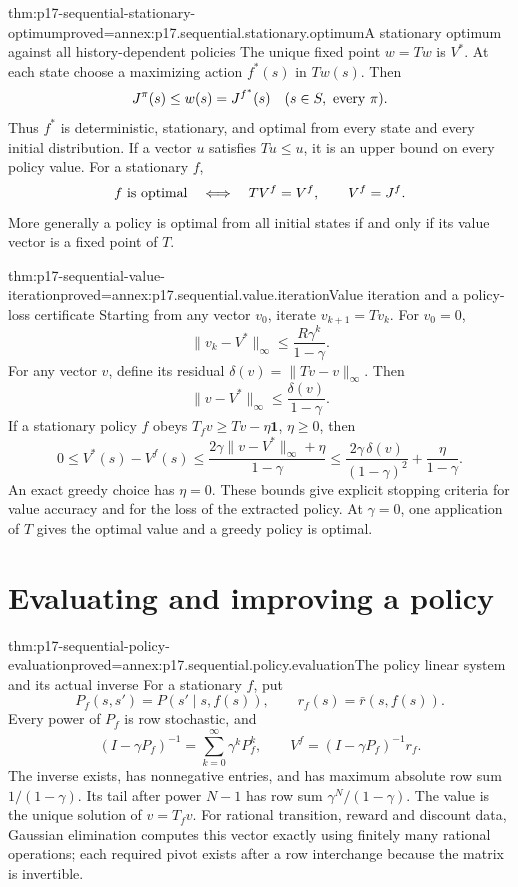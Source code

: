 \begin{hbtheorem}{thm:p17-sequential-stationary-optimum}{proved=annex:p17.sequential.stationary.optimum}{A stationary optimum against all history-dependent policies}
The unique fixed point \(w=Tw\) is \(V^*\).
At each state choose a maximizing action \(f^*(s)\) in
\(Tw(s)\). Then
\[
               J^\pi(s)\leq w(s)=J^{f^*}(s)
                       \quad(s\in S,\ \hbox{every }\pi).
\]
Thus \(f^*\) is deterministic, stationary, and optimal from
every state and every initial distribution.
If a vector \(u\) satisfies \(Tu\leq u\), it is an upper
bound on every policy value. For a stationary \(f\),
\[
              f\hbox{ is optimal}
          \quad\Longleftrightarrow\quad TV^f=V^f,
                 \qquad V^f=J^f.
\]
More generally a policy is optimal from all initial states
if and only if its value vector is a fixed point of \(T\).
\end{hbtheorem}

\begin{hbtheorem}{thm:p17-sequential-value-iteration}{proved=annex:p17.sequential.value.iteration}{Value iteration and a policy-loss certificate}
Starting from any vector \(v_0\), iterate \(v_{k+1}=Tv_k\).
For \(v_0=0\),
\[
                   \|v_k-V^*\|_\infty
                        \leq\frac{R\gamma^k}{1-\gamma}.
\]
For any vector \(v\), define its residual
\(\delta(v)=\|Tv-v\|_\infty\). Then
\[
                       \|v-V^*\|_\infty
                             \leq\frac{\delta(v)}{1-\gamma}.
\]
If a stationary policy \(f\) obeys
\(T_fv\geq Tv-\eta\mathbf1\), \(\eta\geq0\), then
\[
 0\leq V^*(s)-V^f(s)
       \leq\frac{2\gamma\|v-V^*\|_\infty+\eta}{1-\gamma}
       \leq
          \frac{2\gamma\,\delta(v)}{(1-\gamma)^2}
                         +\frac{\eta}{1-\gamma}.
\]
An exact greedy choice has \(\eta=0\). These bounds give
explicit stopping criteria for value accuracy and for the
loss of the extracted policy. At \(\gamma=0\), one
application of \(T\) gives the optimal value and a greedy
policy is optimal.
\end{hbtheorem}

\section{Evaluating and improving a policy}

\begin{hbtheorem}{thm:p17-sequential-policy-evaluation}{proved=annex:p17.sequential.policy.evaluation}{The policy linear system and its actual inverse}
For a stationary \(f\), put
\[
 P_f(s,s')=P(s'\mid s,f(s)),\qquad r_f(s)=\bar r(s,f(s)).
\]
Every power of \(P_f\) is row stochastic, and
\[
 (I-\gamma P_f)^{-1}=\sum_{k=0}^{\infty}\gamma^kP_f^k,
 \qquad
 V^f=(I-\gamma P_f)^{-1}r_f.
\]
The inverse exists, has nonnegative entries, and has
maximum absolute row sum \(1/(1-\gamma)\).
Its tail after power \(N-1\) has row sum
\(\gamma^N/(1-\gamma)\).
The value is the unique solution of \(v=T_fv\).
For rational transition, reward and discount data, Gaussian
elimination computes this vector exactly using finitely many
rational operations; each required pivot exists after a row
interchange because the matrix is invertible.
\end{hbtheorem}

